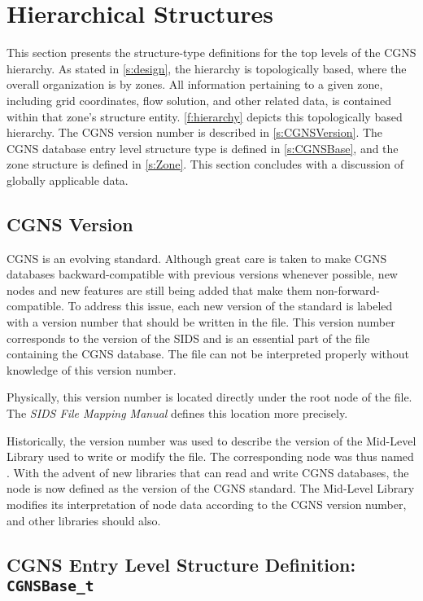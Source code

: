 \section{Hierarchical Structures}
\label{s:topo}
\thispagestyle{plain}

This section presents the structure-type definitions for the top levels
of the CGNS hierarchy.
As stated in \autoref{s:design}, the hierarchy is topologically
based, where the overall organization is by zones.
All information pertaining to a given zone, including grid coordinates,
flow solution, and other related data, is contained within that zone's
structure entity.
\autoref{f:hierarchy} depicts this topologically based hierarchy.
The CGNS version number is described in \autoref{s:CGNSVersion}.
The CGNS database entry level structure type is defined in
\autoref{s:CGNSBase}, and the zone structure is defined in
\autoref{s:Zone}.
This section concludes with a discussion of globally applicable data.

\subsection{CGNS Version}
\label{s:CGNSVersion}

CGNS is an evolving standard.
Although great care is taken to make CGNS databases backward-compatible
with previous versions whenever possible, new nodes and new features are
still being added that make them non-forward-compatible.
To address this issue, each new version of the standard is labeled with
a version number that should be written in the file.
This version number corresponds to the version of the SIDS and is an
essential part of the file containing the CGNS database.
The file can not be interpreted properly without knowledge of this
version number.

Physically, this version number is located directly under the root node
of the file.
The \textit{SIDS File Mapping Manual}
defines this location more precisely.

Historically, the version number was used to describe the version of the
Mid-Level Library used to write or modify the file.
The corresponding node was thus named .
With the advent of new libraries that can read and write CGNS databases,
the node is now defined as the version of the CGNS standard.
The Mid-Level Library modifies its interpretation of node data according
to the CGNS version number, and other libraries should also.

\subsection{CGNS Entry Level Structure Definition: \texttt{CGNSBase\_t}}
\label{s:CGNSBase}

